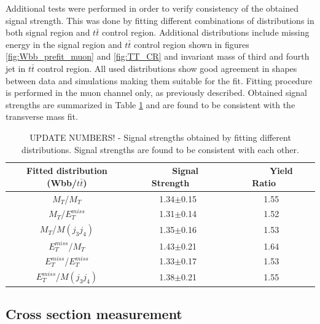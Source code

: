 Additional tests were performed in order to verify consistency of the obtained signal strength.
This was done by fitting different combinations of distributions in both signal region and $t\bar{t}$ control region.
Additional distributions include missing energy in the signal region and $t\bar{t}$ control region shown in figures \ref{fig:Wbb_prefit_muon} and \ref{fig:TT_CR} and invariant mass of third and fourth jet in $t\bar{t}$ control region. All used distributions show good agreement
in shapes between data and simulations making them suitable for the fit. Fitting procedure is performed in the muon channel only, as previously described.
Obtained signal strengths are summarized in Table \ref{tab:addFitTest} and are found to be consistent with the transverse mass fit.
\begin{table}[!htb]
\begin{center}
   \begin{tabular} {ccc} \hline\hline
   Fitted distribution (Wbb/$t\bar{t}$) & ~~~Signal Strength~~~ & ~~~~Yield Ratio~~~ \\
        \hline
        $M_T$/$M_T$                     &1.34$\pm$0.15  &1.55\\
        $M_T$/$E^{miss}_T$              &1.31$\pm$0.14  &1.52\\
        $M_T$/$M(j_3j_4)$               &1.35$\pm$0.16  &1.53\\
        $E^{miss}_T$/$M_T$              &1.43$\pm$0.21  &1.64\\
        $E^{miss}_T$/$E^{miss}_T$       &1.33$\pm$0.17  &1.53\\
        $E^{miss}_T$/$M(j_3j_4)$        &1.38$\pm$0.21  &1.55\\
   \hline\hline
   \end{tabular}
 \caption{UPDATE NUMBERS! - Signal strengths obtained by fitting different distributions. Signal strengths are found to be consistent with each other.}
\label{tab:addFitTest}
\end{center}
\end{table}

\subsection{Cross section measurement}

